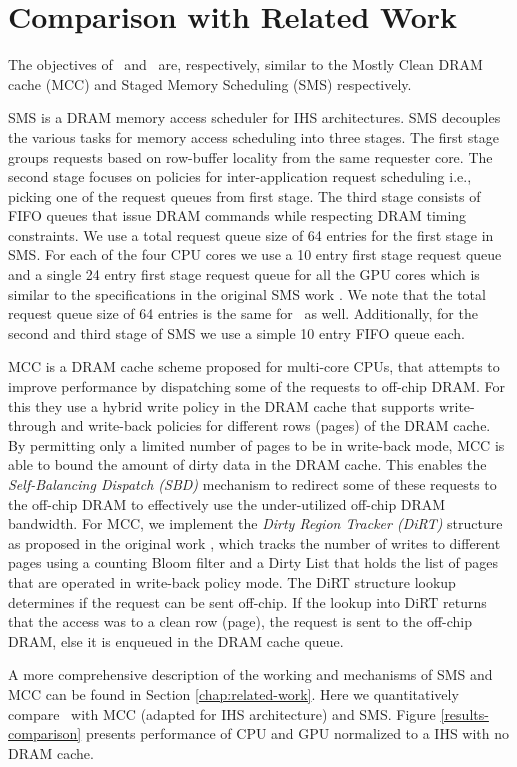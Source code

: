 \section{Comparison with Related Work} \label{comparison}
The objectives of \bypassname\ and \prioname\ are, respectively, similar to the Mostly Clean DRAM cache (MCC) \cite{mostly-clean} and Staged Memory Scheduling (SMS) \cite{sms} respectively. 
\par SMS \cite{sms} is a DRAM memory access scheduler for IHS architectures. SMS decouples the various tasks for memory access scheduling into three stages. The first stage groups requests based on row-buffer locality from the same requester core. The second stage focuses on policies for inter-application request scheduling i.e., picking one of the request queues from first stage. The third stage consists of FIFO queues that issue DRAM commands while respecting DRAM timing constraints. We use a total request queue size of 64 entries for the first stage in SMS. For each of the four CPU cores we use a 10 entry first stage request queue and a single 24 entry first stage request queue for all the GPU cores which is similar to the specifications in the original SMS work \cite{sms}. We note that the total request queue size of 64 entries is the same for \prioname\ as well. Additionally, for the second and third stage of SMS we use a simple 10 entry FIFO queue each.
\par MCC \cite{mostly-clean} is a DRAM cache scheme proposed for multi-core CPUs, that attempts to improve performance by dispatching some of the requests to off-chip DRAM. For this they use a hybrid write policy in the DRAM cache that supports write-through and write-back policies for different rows (pages) of the DRAM cache. By permitting only a limited number of pages to be in write-back mode, MCC is able to bound the amount of dirty data in the DRAM cache. This enables the \textit{Self-Balancing Dispatch (SBD)} mechanism to redirect some of these requests to the off-chip DRAM to effectively use the under-utilized off-chip DRAM bandwidth. For MCC, we implement the \textit{Dirty Region Tracker (DiRT)} structure as proposed in the original work \cite{mostly-clean}, which tracks the number of writes to different pages using a counting Bloom filter and a Dirty List that holds the list of pages that are operated in write-back policy mode. The DiRT structure lookup determines if the request can be sent off-chip. If the lookup into DiRT returns that the access was to a clean row (page), the request is sent to the off-chip DRAM, else it is enqueued in the DRAM cache queue.
\par A more comprehensive description of the working and mechanisms of SMS and MCC can be found in Section \ref{chap:related-work}. Here we quantitatively compare \cachename\ with MCC (adapted for IHS architecture) and SMS. Figure \ref{results-comparison} presents performance of CPU and GPU normalized to a IHS with no DRAM cache.

